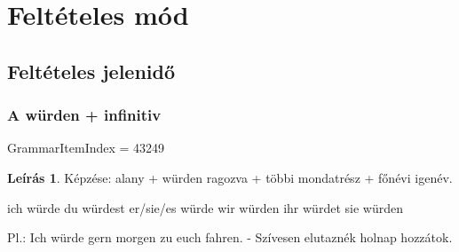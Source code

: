 \documentclass{article}
\theoremstyle{definition}
\newtheorem*{desc}{Leírás}
\begin{document}
\section{Feltételes mód}

\subsection{Feltételes jelenidő}

\subsubsection{A würden + infinitiv}

GrammarItemIndex = 43249

\begin{desc}
Képzése: alany + würden ragozva + többi mondatrész + főnévi igenév.

ich würde
du würdest
er/sie/es würde
wir würden
ihr würdet
sie würden

Pl.: Ich würde gern morgen zu euch fahren. - Szívesen elutaznék holnap hozzátok.
\end{desc}
\end{document}
